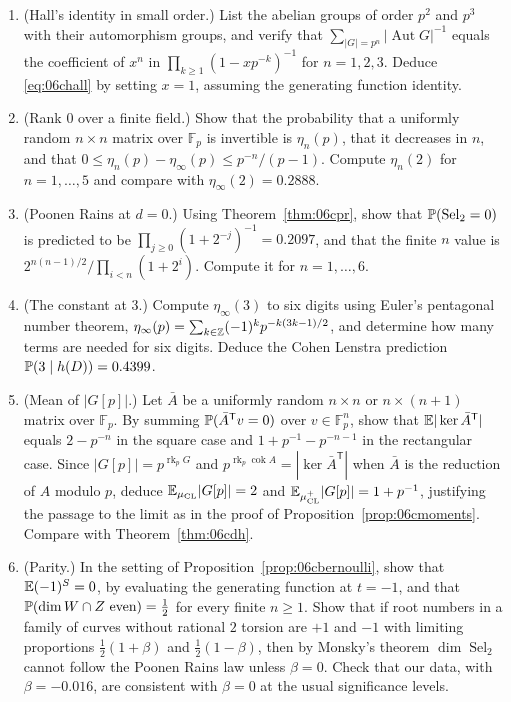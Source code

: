 \begin{enumerate}
\item (Hall's identity in small order.) List the abelian groups of order $p^2$ and $p^3$ with their automorphism groups, and verify that $\sum_{|G| = p^n}|\operatorname{Aut}G|^{-1}$ equals the coefficient of $x^n$ in $\prod_{k\ge1}(1-xp^{-k})^{-1}$ for $n = 1,2,3$. Deduce \eqref{eq:06chall} by setting $x = 1$, assuming the generating function identity.
\item (Rank $0$ over a finite field.) Show that the probability that a uniformly random $n\times n$ matrix over $\mathbb{F}_p$ is invertible is $\eta_n(p)$, that it decreases in $n$, and that $0\le\eta_n(p)-\eta_\infty(p)\le p^{-n}/(p-1)$. Compute $\eta_n(2)$ for $n = 1,\dots,5$ and compare with $\eta_\infty(2) = 0.2888$.
\item (Poonen Rains at $d = 0$.) Using Theorem~\ref{thm:06cpr}, show that $\mathbb{P}(\operatorname{Sel}_2 = 0)$ is predicted to be $\prod_{j\ge0}(1+2^{-j})^{-1} = 0.2097$, and that the finite $n$ value is $2^{n(n-1)/2}/\prod_{i<n}(1+2^i)$. Compute it for $n = 1,\dots,6$.
\item (The constant at $3$.) Compute $\eta_\infty(3)$ to six digits using Euler's pentagonal number theorem, $\eta_\infty(p) = \sum_{k\in\mathbb{Z}}(-1)^kp^{-k(3k-1)/2}$, and determine how many terms are needed for six digits. Deduce the Cohen Lenstra prediction $\mathbb{P}(3\mid h(D)) = 0.4399$.
\item (Mean of $|G[p]|$.) Let $\bar A$ be a uniformly random $n\times n$ or $n\times(n+1)$ matrix over $\mathbb{F}_p$. By summing $\mathbb{P}(\bar A^{\mathsf T}v = 0)$ over $v\in\mathbb{F}_p^n$, show that $\mathbb{E}|\ker\bar A^{\mathsf T}|$ equals $2-p^{-n}$ in the square case and $1+p^{-1}-p^{-n-1}$ in the rectangular case. Since $|G[p]| = p^{\operatorname{rk}_pG}$ and $p^{\operatorname{rk}_p\operatorname{cok}A} = |\ker\bar A^{\mathsf T}|$ when $\bar A$ is the reduction of $A$ modulo $p$, deduce $\mathbb{E}_{\mu_{\mathrm{CL}}}|G[p]| = 2$ and $\mathbb{E}_{\mu^+_{\mathrm{CL}}}|G[p]| = 1+p^{-1}$, justifying the passage to the limit as in the proof of Proposition~\ref{prop:06cmoments}. Compare with Theorem~\ref{thm:06cdh}.
\item (Parity.) In the setting of Proposition~\ref{prop:06cbernoulli}, show that $\mathbb{E}(-1)^S = 0$, by evaluating the generating function at $t = -1$, and that $\mathbb{P}(\dim W\cap Z\text{ even}) = \frac12$ for every finite $n\ge1$. Show that if root numbers in a family of curves without rational $2$ torsion are $+1$ and $-1$ with limiting proportions $\frac12(1+\beta)$ and $\frac12(1-\beta)$, then by Monsky's theorem $\dim\operatorname{Sel}_2$ cannot follow the Poonen Rains law unless $\beta = 0$. Check that our data, with $\beta = -0.016$, are consistent with $\beta = 0$ at the usual significance levels.
\end{enumerate}

